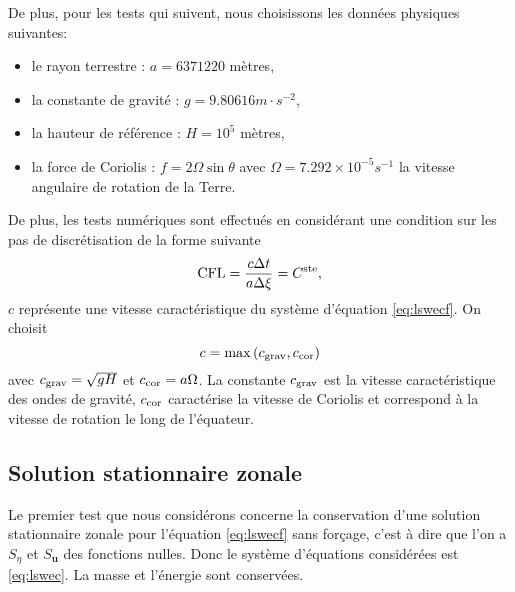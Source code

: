 De plus, pour les tests qui suivent, nous choisissons les données physiques suivantes:
\begin{itemize}
\item le rayon terrestre : $a = 6371220 $ mètres,
\item la constante de gravité : $g = 9.80616 \si{m \cdot s^{-2}}$,
\item la hauteur de référence : $H=10^5$ mètres,
\item la force de Coriolis : $f = 2 \Omega \sin \theta$ avec $\Omega = 7.292 \times 10^{-5} \si{s^{-1}}$ la vitesse angulaire de rotation de la Terre.
\end{itemize}
De plus, les tests numériques sont effectués en considérant une condition sur les pas de discrétisation de la forme suivante 
\begin{equation}
\text{CFL} = \dfrac{c \Delta t}{a \Delta \xi} = C^{\text{ste}},
\end{equation}
$c$ représente une vitesse caractéristique du système d'équation \eqref{eq:lswecf}. On choisit
\begin{equation}
c = \max \left( c_{\text{grav}}, c_{\text{cor}} \right)
\end{equation}
avec $c_{\text{grav}} = \sqrt{gH}$ et $c_{\text{cor}} = a \Omega$. La constante $c_{\text{grav}}$ est la vitesse caractéristique des ondes de gravité, $c_{\text{cor}}$ caractérise la vitesse de Coriolis et correspond à la vitesse de rotation le long de l'équateur.










\subsection{Solution stationnaire zonale}

Le premier test que nous considérons concerne la conservation d'une solution stationnaire zonale pour l'équation \eqref{eq:lswecf} sans forçage, c'est à dire que l'on a $S_{\eta}$ et $S_{\mathbf{u}}$ des fonctions nulles. Donc le système d'équations considérées est \eqref{eq:lswec}. La masse et l'énergie sont conservées.

